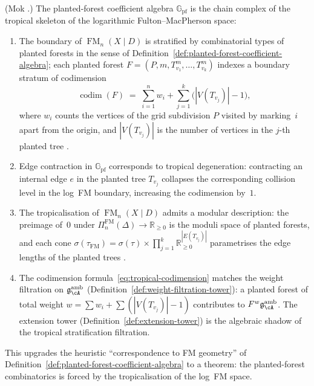 \begin{proposition}
\label{prop:planted-forest-tropical}
\textup{(Mok \cite[Theorem~3.3.1(2), Definition~3.1.5]{Mok25}.)}
The planted-forest coefficient algebra $\mathbb{G}_{\mathrm{pf}}$
is the chain complex of the tropical skeleton of the logarithmic
Fulton--MacPherson space:
\begin{enumerate}[label=\textup{(\roman*)}]
\item The boundary of\/ $\operatorname{FM}_n(X \mathbin{|} D)$ is
  stratified by combinatorial types of planted forests in the sense
  of Definition~\textup{\ref{def:planted-forest-coefficient-algebra}};
  each planted forest $F = (P, m, T^m_{v_1}, \ldots, T^m_{v_k})$
  indexes a boundary stratum of codimension
  \begin{equation}\label{eq:tropical-codimension}
  \operatorname{codim}(F)
  \;=\;
  \sum_{i=1}^{n} w_i
  + \sum_{j=1}^{k} \bigl(|V(T_{v_j})| - 1\bigr),
  \end{equation}
  where $w_i$ counts the vertices of the grid subdivision $P$
  visited by marking~$i$ apart from the origin, and
  $|V(T_{v_j})|$ is the number of vertices in the $j$-th planted
  tree \cite[Proposition~3.3.2]{Mok25}.
\item Edge contraction in $\mathbb{G}_{\mathrm{pf}}$ corresponds to
  tropical degeneration: contracting an internal edge $e$ in the
  planted tree $T_{v_j}$ collapses the corresponding collision
  level in the log~FM boundary, increasing the codimension by~$1$.
\item The tropicalisation of $\operatorname{FM}_n(X \mathbin{|} D)$
  admits a modular description: the preimage of~$0$ under
  $\Pi_n^{\mathrm{FM}}(\Delta) \to \mathbb{R}_{\geq 0}$ is the
  moduli space of planted forests, and each cone
  $\sigma(\tau_{\mathrm{FM}}) = \sigma(\tau) \times
  \prod_{j=1}^k \mathbb{R}_{\geq 0}^{|E(T_{v_j})|}$
  parametrises the edge lengths of the planted trees
  \cite[Observation~5.2.5]{Mok25}.
\item The codimension formula~\eqref{eq:tropical-codimension}
  matches the weight filtration on
  $\mathfrak{g}^{\mathrm{amb}}_{\cA}$
  \textup{(}Definition~\textup{\ref{def:weight-filtration-tower})}:
  a planted forest of total weight $w = \sum w_i + \sum(|V(T_{v_j})|-1)$
  contributes to $F^w\mathfrak{g}^{\mathrm{amb}}_{\cA}$.
  The extension tower
  \textup{(}Definition~\textup{\ref{def:extension-tower})} is the
  algebraic shadow of the tropical stratification filtration.
\end{enumerate}
This upgrades the heuristic ``correspondence to FM geometry'' of
Definition~\textup{\ref{def:planted-forest-coefficient-algebra}} to a
theorem: the planted-forest combinatorics is forced by the
tropicalisation of the log~FM space.
\end{proposition}

